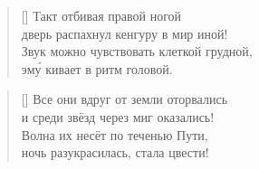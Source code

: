 \documentclass[14pt]{memoir}
\begin{document}
\BgThispage



\begin{verse}[\versewidth]
Такт отбивая правой ногой\\
дверь распахнул кенгуру в мир иной!\\
Звук можно чувствовать клеткой грудной,\\
эм\'{у} кивает в ритм головой.
\end{verse}

\begin{verse}[\versewidth]
Все они вдруг от земли оторвались\\
и среди звёзд через миг оказались!\\
Волна их несёт по теченью Пути,\\
ночь разукрасилась, стала цвести!
\end{verse}
\end{document}
